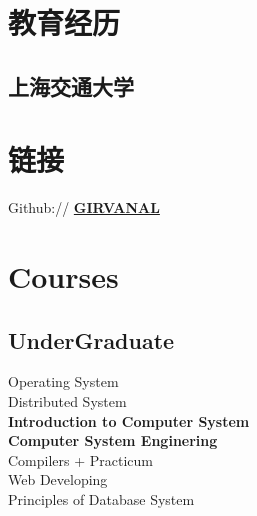 \documentclass[]{deedy-resume-openfont}
\begin{document}
%
%
\lastupdated

%
%

%
%

\begin{minipage}[t]{0.3\textwidth} 


\section{教育经历} 
\sectionsep

\subsection{上海交通大学}
\sectionsep



\section{链接}
\sectionsep

Github:// \href{https://github.com/GIRVANAL}{\bf GIRVANAL} \\


\section{Courses}
\sectionsep
\subsection{UnderGraduate}
Operating System \\
Distributed System \\
\textbf{Introduction to Computer System} \\
\textbf{Computer System Enginering} \\
Compilers + Practicum \\
Web Developing \\
Principles of Database System  \\
\sectionsep


\end{minipage}
\end{document}
